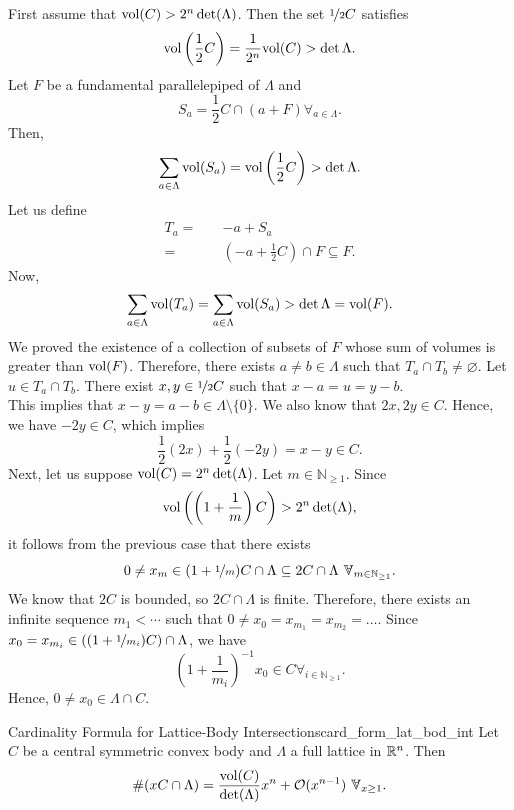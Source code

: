 \documentclass{Vorlesungstemplate_English} %
\renewcommand{\N}{\mathbb{N}_{\geq 1}}
\begin{document}
  \begin{pf}
    First assume that $\text{vol}(C) > 2^n\det(\Lambda)$. Then the set $\nicefrac{1}{2}C$ satisfies
    \[ \text{vol}\left(\frac{1}{2}C\right) = \frac{1}{2^n}\text{vol}(C) > \det\Lambda.\]
    Let $F$ be a fundamental parallelepiped of $\Lambda$ and
    \[ S_a = \frac{1}{2}C \cap (a+F) \forall_{a \in \Lambda}.\]
    Then,
    \[ \sum_{a \in \Lambda}\text{vol}(S_a) = \text{vol}\left(\frac{1}{2}C\right) > \det\Lambda.\]
    Let us define
    \begin{align*} T_a = \quad & -a+S_a \\
    = \quad & \left(-a+\frac{1}{2}C\right) \cap F \subseteq F.
    \end{align*}
    Now,
    \[ \sum_{a \in \Lambda}\text{vol}(T_a) = \sum_{a \in \Lambda}\text{vol}(S_a) > \det\Lambda = \text{vol}(F).\]
    We proved the existence of a collection of subsets of $F$ whose sum of volumes is greater than $\text{vol}(F)$. Therefore, there exists $a \neq b \in \Lambda$ such that $T_a \cap T_b \neq \varnothing$. Let $u \in T_a \cap T_b$. There exist $x,y \in \nicefrac{1}{2}C$ such that $x-a=u=y-b$. \\
    This implies that $x-y = a-b \in \Lambda \setminus \{ 0\}$. We also know that $2x,2y \in C$. Hence, we have $-2y \in C$, which implies
    \[ \frac{1}{2}(2x)+\frac{1}{2}(-2y) = x-y \in C.\]
    Next, let us suppose $\text{vol}(C) = 2^n\det(\Lambda)$. Let $m \in \N$. Since
    \[ \text{vol}\left(\left(1+\frac{1}{m}\right)C\right) > 2^n\det(\Lambda),\]
    it follows from the previous case that there exists
    \[ 0 \neq x_m \in (1+\nicefrac{1}{m})C \cap \Lambda \subseteq 2C\cap\Lambda \forall_{m \in \N}.\]
    We know that $2C$ is bounded, so $2C \cap \Lambda$ is finite. Therefore, there exists an infinite sequence $m_1 < \cdots$ such that $0 \neq x_0 = x_{m_1} = x_{m_2} = \dots$. Since $x_0 = x_{m_i} \in ((1+\nicefrac{1}{m_i})C) \cap \Lambda$, we have
    \[ \left(1+\frac{1}{m_i}\right)^{-1}x_0 \in C \forall_{i \in \N}.\]
    Hence, $0 \neq x_0 \in \Lambda \cap C$.
  \end{pf}
  \begin{lemma}{Cardinality Formula for Lattice-Body Intersections}{card_form_lat_bod_int}
    Let $C$ be a central symmetric convex body and $\Lambda$ a full lattice in $\mathbb{R}^n$. Then
    \[ \#(xC \cap \Lambda) = \frac{\vol(C)}{\det(\Lambda)}x^n + \O(x^{n-1}) \forall_{x \geq 1}.\]
  \end{lemma}
\end{document}
